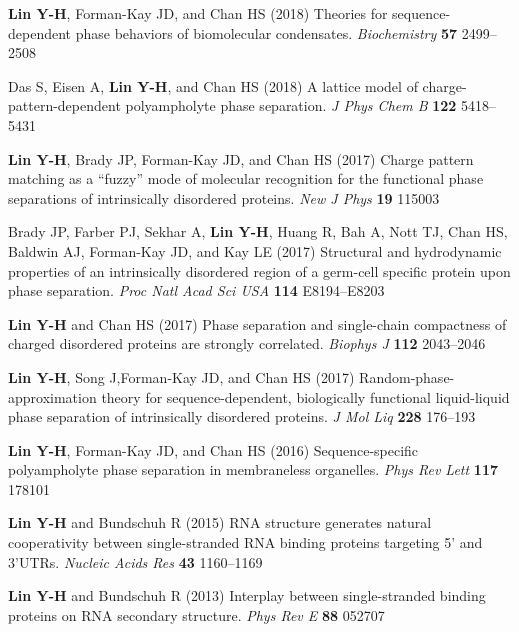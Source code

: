 \documentclass[11pt]{../yhlcv}
\def\tname#1{{\bf #1}}
\begin{document}
\begin{etaremune}[leftmargin=0.26in]
\item
\tname{Lin Y-H}, Forman-Kay JD, and Chan HS (2018)
Theories for sequence-dependent phase behaviors of biomolecular condensates.
{\it Biochemistry} {\bf 57} 2499--2508

\item 
Das S, Eisen A, \tname{Lin Y-H}, and Chan HS (2018)
A lattice model of charge-pattern-dependent polyampholyte phase separation.
{\it J Phys Chem B} {\bf 122} 5418--5431

\item
\tname{Lin Y-H}, Brady JP, Forman-Kay JD, and Chan HS (2017) 
Charge pattern matching as a ``fuzzy'' mode of molecular recognition for the functional phase separations of intrinsically disordered proteins.
{\it New J Phys} {\bf 19} 115003

\item 
Brady JP, Farber PJ, Sekhar A, \tname{Lin Y-H}, Huang R, Bah A, Nott TJ, Chan HS, Baldwin AJ, Forman-Kay JD, and Kay LE (2017) 
Structural and hydrodynamic properties of an intrinsically disordered region of a germ-cell specific protein upon phase separation. 
{\it Proc Natl Acad Sci USA} {\bf 114} E8194--E8203

\item
\tname{Lin Y-H} and Chan HS (2017) 
Phase separation and single-chain compactness of charged disordered proteins are strongly correlated. 
{\it Biophys J} {\bf 112} 2043--2046

\item 
\tname{Lin Y-H}, Song J,Forman-Kay JD, and Chan HS  (2017) 
Random-phase-approximation theory for sequence-dependent, biologically functional liquid-liquid phase separation of intrinsically disordered proteins. 
{\it J Mol Liq} {\bf 228} 176--193

\item
\tname{Lin Y-H}, Forman-Kay JD, and Chan HS (2016) 
Sequence-specific polyampholyte phase separation in membraneless organelles. 
{\it Phys Rev Lett} {\bf 117} 178101

\item 
\tname{Lin Y-H} and Bundschuh R (2015) 
RNA structure generates natural cooperativity between single-stranded RNA binding proteins targeting 5' and 3'UTRs.
{\it Nucleic Acids Res} {\bf 43} 1160--1169

\item 
\tname{Lin Y-H} and Bundschuh R (2013) 
Interplay between single-stranded binding proteins on RNA secondary structure.
{\it Phys Rev E} {\bf 88} 052707

\end{etaremune} 
\end{document}
